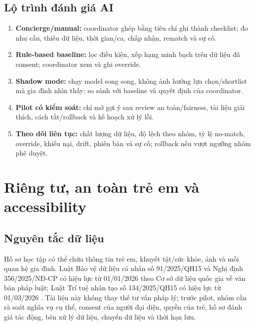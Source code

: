 \documentclass[11pt,a4paper]{article}
\begin{document}
\subsection{Lộ trình đánh giá AI}
\begin{enumerate}
  \item \textbf{Concierge/manual:} coordinator ghép bằng tiêu chí ghi thành checklist; đo nhu cầu, thiếu dữ liệu, thời gian/ca, chấp nhận, rematch và sự cố.
  \item \textbf{Rule-based baseline:} lọc điều kiện, xếp hạng minh bạch trên dữ liệu đã consent; coordinator xem và ghi override.
  \item \textbf{Shadow mode:} chạy model song song, không ảnh hưởng lựa chọn/shortlist mà gia đình nhìn thấy; so sánh với baseline và quyết định của coordinator.
  \item \textbf{Pilot có kiểm soát:} chỉ mở gợi ý sau review an toàn/fairness, tài liệu giải thích, cách tắt/rollback và kế hoạch xử lý lỗi.
  \item \textbf{Theo dõi liên tục:} chất lượng dữ liệu, độ lệch theo nhóm, tỷ lệ no-match, override, khiếu nại, drift, phiên bản và sự cố; rollback nếu vượt ngưỡng nhóm phê duyệt.
\end{enumerate}

\section{Riêng tư, an toàn trẻ em và accessibility}

\subsection{Nguyên tắc dữ liệu}
Hồ sơ học tập có thể chứa thông tin trẻ em, khuyết tật/sức khỏe, ảnh và mối quan hệ gia đình. Luật Bảo vệ dữ liệu cá nhân số 91/2025/QH15 và Nghị định 356/2025/NĐ-CP có hiệu lực từ 01/01/2026 theo Cơ sở dữ liệu quốc gia về văn bản pháp luật; Luật Trí tuệ nhân tạo số 134/2025/QH15 có hiệu lực từ 01/03/2026 \cite{pdpLaw,decree356,aiLaw}. Tài liệu này không thay thế tư vấn pháp lý; trước pilot, nhóm cần rà soát nghĩa vụ cụ thể, consent của người đại diện, quyền của trẻ, hồ sơ đánh giá tác động, bên xử lý dữ liệu, chuyển dữ liệu và thời hạn lưu.
\end{document}
